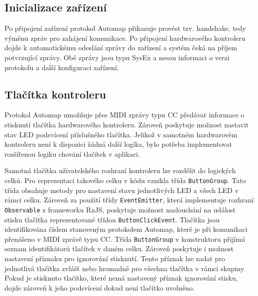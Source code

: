 \documentclass[thesis=M,czech]{FITthesis}[2019/03/06]
\begin{document}
		\subsection{Inicializace zařízení}
		Po připojení zařízení protokol Automap přikazuje provést tzv. handshake, tedy výměnu zpráv
		pro zahájení komunikace. Po připojení hardwarového kontroleru dojde k automatickému odeslání zprávy do zařízení
		a systém čeká na příjem potvrzující zprávy. 
		Obě zprávy jsou typu SysEx a nesou informaci o verzi protokolu a další konfiguraci zařízení.
		
		\subsection{Tlačítka kontroleru}
		Protokol Automap umožňuje přes MIDI zprávy typu CC předávat informace o stisknutí tlačítka
		hardwarového kontroleru. Zároveň poskytuje možnost nastavit stav LED podsvícení příslušného tlačítka.
		Jelikož v samotném hardwarovém kontroleru není k dispozici žádná další logika, bylo potřeba
		implementovat rozšířenou logiku chování tlačítek v aplikaci.
		
		Samotná tlačítka uživatelského rozhraní kontroleru lze rozdělit do logických celků.
		Pro reprezentaci takového celku v kódu vznikla třída \texttt{ButtonGroup}. Tato třída
		obsahuje metody pro nastavení stavu jednotlivých LED a všech LED v rámci celku.
		Zároveň za použití třídy \texttt{EventEmitter}, která implementuje rozhraní \texttt{Observable} 
		z frameworku RxJS, poskytuje možnost naslouchání na událost stisku tlačítka reprezentované třídou \texttt{Button\-Click\-Event}.
		Tlačítka jsou identifikována číslem stanoveným protokolem Automap, které je při komunikaci přenášeno
		v MIDI zprávě typu CC. Třída \texttt{ButtonGroup} v konstruktoru přijímá seznam identifikátorů tlačítek
		v daném celku. Zároveň poskytuje i možnost nastavení příznaku pro ignorování stisknutí.
		Tento příznak lze zadat pro jednotlivá tlačítka zvlášť nebo hromadně pro všechna tlačítka v rámci skupiny.
		Pokud je stisknuto tlačítko, které nemá nastavený příznak ignorování stisku, dojde zároveň k jeho podsvícení dokud není tlačítko uvolněno.
		
\end{document}
